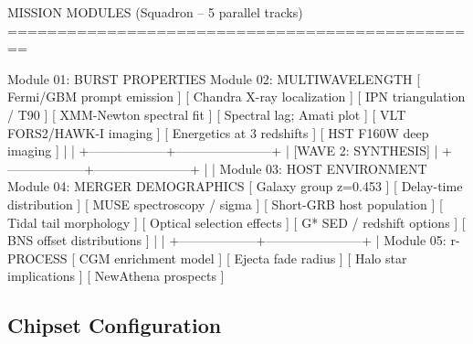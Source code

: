 \documentclass[11pt,letterpaper]{article}
\begin{document}
\begin{asciibox}
MISSION MODULES (Squadron -- 5 parallel tracks)
================================================

  Module 01: BURST PROPERTIES              Module 02: MULTIWAVELENGTH
  [ Fermi/GBM prompt emission ]            [ Chandra X-ray localization ]
  [ IPN triangulation / T90 ]             [ XMM-Newton spectral fit    ]
  [ Spectral lag; Amati plot  ]            [ VLT FORS2/HAWK-I imaging   ]
  [ Energetics at 3 redshifts ]           [ HST F160W deep imaging     ]
         |                                          |
         +------------------+-----------------------+
                            |
                   [WAVE 2: SYNTHESIS]
                            |
         +------------------+-----------------------+
         |                                          |
  Module 03: HOST ENVIRONMENT             Module 04: MERGER DEMOGRAPHICS
  [ Galaxy group z=0.453      ]           [ Delay-time distribution     ]
  [ MUSE spectroscopy / sigma ]           [ Short-GRB host population   ]
  [ Tidal tail morphology     ]           [ Optical selection effects   ]
  [ G* SED / redshift options ]           [ BNS offset distributions    ]
         |                                          |
         +------------------+-----------------------+
                            |
                   Module 05: r-PROCESS
                   [ CGM enrichment model   ]
                   [ Ejecta fade radius     ]
                   [ Halo star implications ]
                   [ NewAthena prospects    ]
\end{asciibox}

\subsection{Chipset Configuration}
\end{document}
